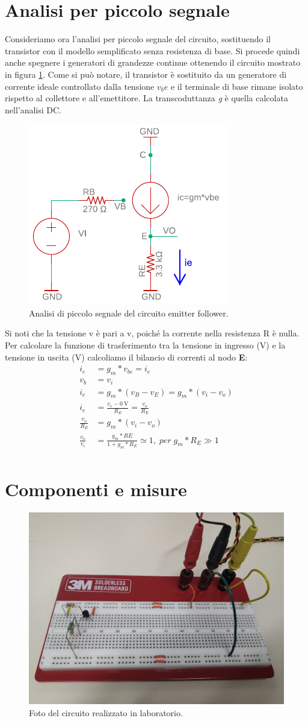 \section{Analisi per piccolo segnale}
Consideriamo ora l'analisi per piccolo segnale del circuito, sostituendo il transistor con il modello semplificato senza resistenza di base. Si procede quindi anche spegnere i generatori di grandezze continue ottenendo il circuito mostrato in figura \ref{fig:emitterfollwer_piccolo segnale}. Come si può notare, il transistor è sostituito da un generatore di corrente ideale controllato dalla tensione $v_be$ e il terminale di base rimane isolato rispetto al collettore e all'emettitore. La transcoduttanza \textit{g} è quella calcolata nell'analisi DC.
\begin{figure}[h!]
	\centering
	\includegraphics[width=0.4\linewidth]{./OtherFiles/Laboratorio 1/emitter follower_piccolo segnale_printout}
	\caption{Analisi di piccolo segnale del circuito emitter follower.}
	\label{fig:emitterfollwer_piccolo segnale}
\end{figure}
Si noti che la tensione v è pari a v, poiché la corrente nella resistenza R è nulla.
Per calcolare la funzione di trasferimento tra la tensione in ingresso (V) e la tensione in uscita (V) calcoliamo il bilancio di correnti al nodo \textbf{E}:
\begin{equation}
	\begin{split}
		i_c&=g_m * v_{be} = i_e \\ 
		v_b&=v_i \\
		i_c&=g_m*(v_B-v_E)=g_m*(v_i-v_o) \\
		i_e&=\frac{v_e-\SI{0}{\volt}}{R_E}=\frac{v_o}{R_E} \\
		\frac{v_o}{R_E}&=g_m*(v_i-v_o) \\
		\frac{v_o}{v_i}&=\frac{g_m*RE}{1+g_m*R_E}\simeq 1, \; per \; g_m*R_E\gg 1 \\
	\end{split}
\end{equation}



\section{Componenti e misure}
\begin{figure}[h!]
	\centering
	\includegraphics[width=0.4\linewidth]{./ImageFiles/Laboratorio 1/IMG_20220510_103526}
	\caption{Foto del circuito realizzato in laboratorio.}
	\label{fig:emitterfollwer_circuito}
\end{figure}